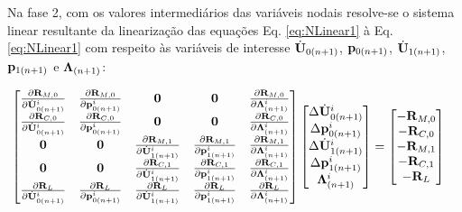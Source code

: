 \documentclass[tese_patricia]{subfiles}
\begin{document}
Na fase 2, com os valores intermediários das variáveis nodais resolve-se o sistema linear resultante da linearização das equações Eq. \eqref{eq:NLinear1} à Eq. \eqref{eq:NLinear1} com respeito às variáveis de interesse $\dot{\mathbf{U}}_{0(n+1)}$, $\mathbf{p}_{0(n+1)}$,  $\dot{\mathbf{U}}_{1(n+1)}$, $\mathbf{p}_{1(n+1)}$ e $\boldsymbol{\Lambda}_{(n+1)}$:

\begin{align}
	\begin{bmatrix}
		\frac{\partial\mathbf{R}_{M,0}}{\partial\dot{\mathbf{U}}_{0(n+1)}^{i}} & \frac{\partial\mathbf{R}_{M,0}}{\partial\mathbf{p}_{0(n+1)}^{i}} & \mathbf{0} & \mathbf{0} & \frac{\partial\mathbf{R}_{M,0}}{\partial\boldsymbol{\Lambda}_{(n+1)}^{i}} \\
		\frac{\partial\mathbf{R}_{C,0}}{\partial\dot{\mathbf{U}}_{0(n+1)}^{i}} & \frac{\partial\mathbf{R}_{C,0}}{\partial\mathbf{p}_{0(n+1)}^{i}} & \mathbf{0} & \mathbf{0} & \frac{\partial\mathbf{R}_{C,0}}{\partial\boldsymbol{\Lambda}_{(n+1)}^{i}} \\
		 \mathbf{0} & \mathbf{0} & \frac{\partial\mathbf{R}_{M,1}}{\partial\dot{\mathbf{U}}_{1(n+1)}^{i}} & \frac{\partial\mathbf{R}_{M,1}}{\partial\mathbf{p}_{1(n+1)}^{i}} & \frac{\partial\mathbf{R}_{M,1}}{\partial\boldsymbol{\Lambda}_{(n+1)}^{i}} \\
		 \mathbf{0} & \mathbf{0} & \frac{\partial\mathbf{R}_{C,1}}{\partial\dot{\mathbf{U}}_{1(n+1)}^{i}} & \frac{\partial\mathbf{R}_{C,1}}{\partial\mathbf{p}_{1(n+1)}^{i}} & \frac{\partial\mathbf{R}_{C,1}}{\partial\boldsymbol{\Lambda}_{(n+1)}^{i}} \\
		  \frac{\partial\mathbf{R}_{L}}{\partial\dot{\mathbf{U}}_{0(n+1)}^{i}} & \frac{\partial\mathbf{R}_{L}}{\partial\mathbf{p}_{0(n+1)}^{i}} & \frac{\partial\mathbf{R}_{L}}{\partial\dot{\mathbf{U}}_{1(n+1)}^{i}} & \frac{\partial\mathbf{R}_{L}}{\partial\mathbf{p}_{1(n+1)}^{i}} & \frac{\partial\mathbf{R}_{L}}{\partial\boldsymbol{\Lambda}_{(n+1)}^{i}}
	\end{bmatrix}
	\begin{bmatrix}
		\Delta\dot{\mathbf{U}}_{0(n+1)}^{i} \\
		\Delta\mathbf{p}_{0(n+1)}^{i} \\
		\Delta\dot{\mathbf{U}}_{1(n+1)}^{i} \\
		\Delta\mathbf{p}_{1(n+1)}^{i} \\
		\boldsymbol{\Lambda}_{(n+1)}^{i}
	\end{bmatrix}
	&=
	\begin{bmatrix}
		-\mathbf{R}_{M,0} \\
		-\mathbf{R}_{C,0} \\
		-\mathbf{R}_{M,1} \\
		-\mathbf{R}_{C,1} \\
		-\mathbf{R}_{L}
	\end{bmatrix}
	\label{eq:sistema_linear_Arlq}
\end{align}	
\end{document}
